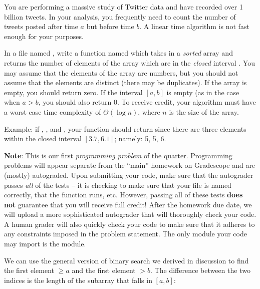 \begin{progprob}
    You are performing a massive study of Twitter data and have recorded over 1
    billion tweets. In your analysis, you frequently need to count the number
    of tweets posted after time $a$ but before time $b$. A linear
    time algorithm is not fast enough for your purposes.

    In a file named , write a function named
     which takes in a \emph{sorted} array  and
    returns the number of elements of the array which are in the \emph{closed} interval
    \python{[a, b]}. You may assume that the elements of the array are numbers, but you
    should not assume that the elements are distinct (there may be duplicates).
    If the array is empty, you should return zero. If the interval $[a, b]$ is empty (as in the case
    when $a > b$, you should also return 0.
    To receive credit, your algorithm must have a worst case time complexity of $\Theta(\log n)$,
    where $n$ is the size of the array.

    Example: if , , and ,
    your function should return  since there are three elements within the closed
    interval $[3.7, 6.1]$; namely: 5, 5, 6.

    \textbf{Note}: This is our first \emph{programming problem} of the quarter. Programming
    problems will appear separate from the ``main'' homework on Gradescope and
    are (mostly) autograded. Upon submitting your code, make sure that the autograder passes
    \emph{all} of the tests -- it is checking to make sure that your file is named correctly,
    that the function runs, etc. However, passing all of these tests \textbf{does not} guarantee
    that you will receive full credit! After the homework due date, we will upload a more
    sophisticated autograder that will thoroughly check your code. A human grader will also
    quickly check your code to make sure that it adheres to any constraints imposed in
    the problem statement. 
    The only module your code may import is the  module.

    \begin{soln}
        We can use the general version of binary search we derived in discussion to find
        the first element $\geq a$ and the first element $>b$. The difference between
        the two indices is the length of the subarray that falls in $[a, b]$:

        \inputminted{python}{\thisdir/include-solution/logcount.py}
    \end{soln}
\end{progprob}
